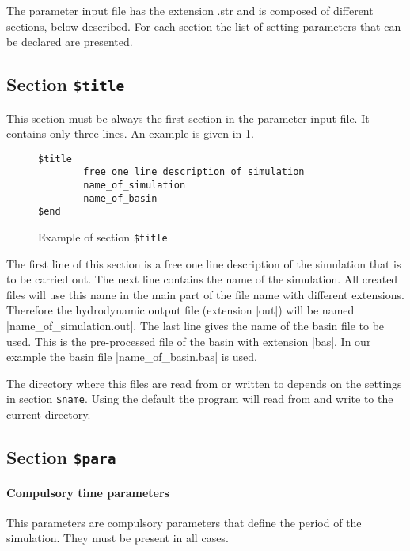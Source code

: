 The parameter input file has the extension .str and is composed of different sections, below described. For each section the list of setting parameters that can be declared are presented.
\subsection{Section {\tt \$title}}
\label{parameter}

This section must be always the first section in the parameter input file.
It contains only three lines. An example is given in
\Fig\ref{fig:titleexample}.

\begin{figure}[hbtp]
\begin{verbatim}
$title
        free one line description of simulation
        name_of_simulation
        name_of_basin
$end
\end{verbatim}
\caption{Example of section {\tt \$title}}
\label{fig:titleexample}
\end{figure}

The first line of this section is a free one line description of
the simulation that is to be carried out. The next line contains
the name of the simulation.
All created files will use this name in the main part of the file name
with different extensions. Therefore the hydrodynamic output file
(extension |out|) will be named |name_of_simulation.out|.
The last line gives the name of the basin file to be used. This
is the pre-processed file of the basin with extension |bas|.
In our example the basin file |name_of_basin.bas| is used.

The directory where this files are read from or written to depends
on the settings in section {\tt \$name}. Using the default
the program will read from and write to the current directory.

\subsection{Section {\tt \$para}}
\paragraph{Compulsory time parameters}

This parameters are compulsory parameters that define the
period of the simulation. They must be present in all cases.

\par
{}
\par
{}
\par



